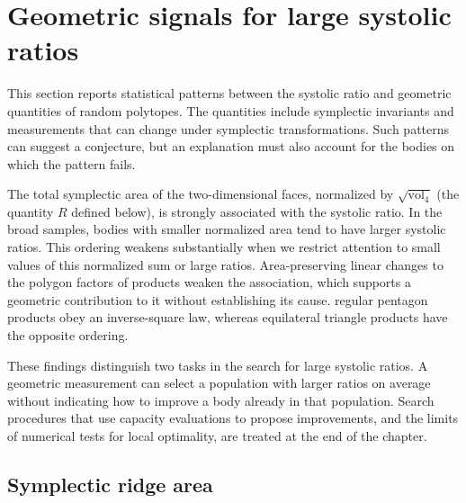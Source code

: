 \section{Geometric signals for large systolic ratios}
\label{sec:fresh-data-search}
\label{sec:black-box-datascience}

This section reports statistical patterns between the systolic ratio and
geometric quantities of random polytopes. The quantities include symplectic
invariants and measurements that can change under symplectic
transformations. Such patterns can suggest a conjecture, but
an explanation must also account for the bodies on which the pattern fails.

The total symplectic area of the two-dimensional faces, normalized by
$\sqrt{\operatorname{vol}_4}$ (the quantity $R$ defined below), is strongly associated with the
systolic ratio. In the broad samples,
bodies with smaller normalized area tend to have larger systolic ratios.
This ordering weakens substantially when we restrict attention to small
values of this normalized sum or large ratios. Area-preserving linear changes to the polygon factors of products
weaken the association, which supports a geometric contribution to it
without establishing its cause.
regular pentagon products obey an inverse-square law, whereas equilateral
triangle products have the opposite ordering.

These findings distinguish two tasks in the search for large systolic
ratios. A geometric measurement can select a population with larger ratios
on average without indicating how to improve a body already in that
population. Search procedures that use capacity evaluations to propose
improvements, and the limits of numerical tests for local optimality, are
treated at the end of the chapter.

\subsection{Symplectic ridge area}
\label{subsec:ds-sampling}

